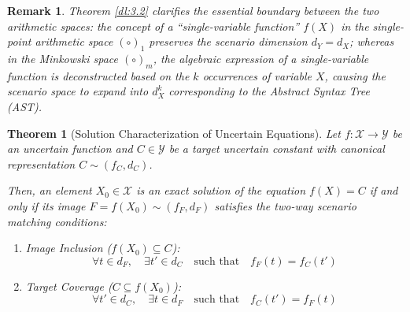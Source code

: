 \documentclass[a4paper,12pt,twoside]{memoir}
\newtheorem{theorem}{Theorem}[chapter]
\newtheorem{remark}{Remark}[chapter]
\begin{document}
	\begin{remark}
		Theorem \ref{dl:3.2} clarifies the essential boundary between the two arithmetic spaces: the concept of a ``single-variable function'' $f(X)$ in the single-point arithmetic space $(\circ)_1$ preserves the scenario dimension $d_Y = d_X$; whereas in the Minkowski space $(\circ)_m$, the algebraic expression of a single-variable function is deconstructed based on the $k$ occurrences of variable $X$, causing the scenario space to expand into $d_X^k$ corresponding to the Abstract Syntax Tree (AST).
	\end{remark}
	
	\begin{theorem}[Solution Characterization of Uncertain Equations]
		\label{thm:solution_characterization}
		Let $f : \mathcal{X} \to \mathcal{Y}$ be an uncertain function and $C \in \mathcal{Y}$ be a target uncertain constant with canonical representation $C \sim (f_C, d_C)$.
		
		Then, an element $X_0 \in \mathcal{X}$ is an exact solution of the equation $f(X) = C$ if and only if its image $F = f(X_0) \sim (f_F, d_F)$ satisfies the two-way scenario matching conditions:
		\begin{enumerate}[leftmargin=*]
			\item Image Inclusion ($f(X_0) \subseteq C$):
			\[
			\forall t \in d_F, \quad \exists t' \in d_C \quad \text{such that} \quad f_F(t) = f_C(t')
			\]
			\item Target Coverage ($C \subseteq f(X_0)$):
			\[
			\forall t' \in d_C, \quad \exists t \in d_F \quad \text{such that} \quad f_C(t') = f_F(t)
			\]
		\end{enumerate}
	\end{theorem}
	
\end{document}

